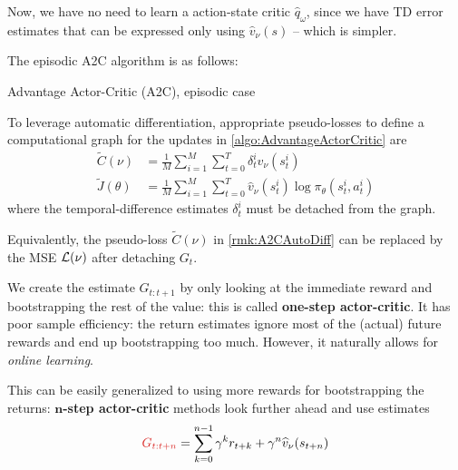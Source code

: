 \documentclass[../course-notes.tex]{subfiles}
\begin{document}
Now, we have no need to learn a action-state critic $\widehat{q}_\omega$, since we have TD error estimates that can be expressed only using $\widehat{v}_\nu(s)$ -- which is simpler.

The episodic A2C algorithm is as follows:

\begin{algorithm}[H]
	\caption{Advantage Actor-Critic (A2C), episodic case}\label{algo:AdvantageActorCritic}
\end{algorithm}


\begin{remark}\label{rmk:A2CAutoDiff}
	To leverage automatic differentiation, appropriate pseudo-losses to define a computational graph for the updates in \cref{algo:AdvantageActorCritic} are
	\begin{subequations}
	\begin{align}
	\tilde{C}(\nu) &= \frac{1}{M}\sum_{i=1}^M
	\sum_{t=0}^T\delta^i_t  \widehat{v}_\nu(s^i_t)  \\
	\tilde{J}(\theta) &=
	\frac{1}{M}\sum_{i=1}^M
	\sum_{t=0}^T \widehat{v}_\nu(s^i_t) \log\pi_\theta(s^i_t,a^i_t)
	\end{align}
	\end{subequations}
	where the temporal-difference estimates $\delta^i_t$ must be detached from the graph.

	Equivalently, the pseudo-loss $\tilde{C}(\nu)$ in \cref{rmk:A2CAutoDiff} can be replaced by the MSE $\mathcal{L}(\nu)$ after detaching $G_t$.
\end{remark}


We create the estimate $G_{t:t+1}$ by only looking at the immediate reward and bootstrapping the rest of the value: this is called \textbf{one-step actor-critic}. It has poor sample efficiency: the return estimates ignore most of the (actual) future rewards and end up bootstrapping too much. However, it naturally allows for \textit{online learning}.	

This can be easily generalized to using more rewards for bootstrapping the returns: \textbf{$\boldsymbol{n}$-step actor-critic} methods look further ahead and use estimates 
\[
	{\redfont G_{t:t+n}}
	= \sum_{k=0}^{n-1}\gamma^k r_{t+k} + \gamma^n \widehat{v}_\nu(s_{t+n})
\]
\end{document}
